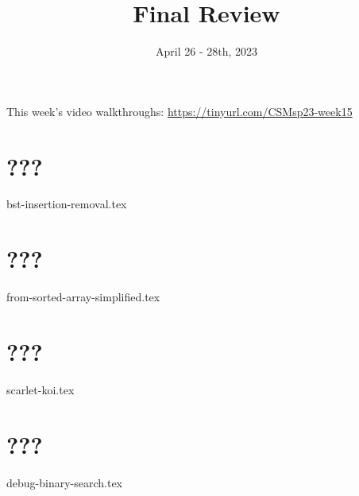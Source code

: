 \documentclass[11pt]{exam}
\title{Final Review}
\date{April 26 - 28th, 2023}
\begin{document}
\maketitle
This week's video walkthroughs:
\href{https://tinyurl.com/CSMsp23-week15}{https://tinyurl.com/CSMsp23-week15}

% 

\section{???}
\begin{questions}
{bst-insertion-removal.tex}
\end{questions}

% 
\pagebreak

\section{???}
\begin{questions}
{from-sorted-array-simplified.tex}
\end{questions}

% 
\pagebreak
\section{???}
\begin{questions}
{scarlet-koi.tex}
\end{questions}

% 

\pagebreak
\section{???}
\begin{questions}
{debug-binary-search.tex}
\end{questions} 
\end{document}
